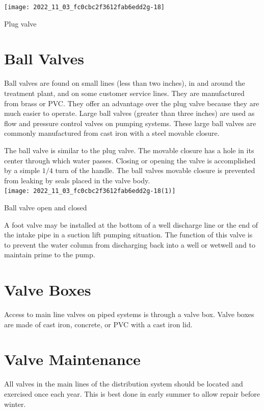 \documentclass[10pt]{article}
\begin{document}
\texttt{[image: 2022\_11\_03\_fc0cbc2f3612fab6edd2g-18]}

Plug valve

\section{Ball Valves}
Ball valves are found on small lines (less than two inches), in and around the treatment plant, and on some customer service lines. They are manufactured from brass or PVC. They offer an advantage over the plug valve because they are much easier to operate. Large ball valves (greater than three inches) are used as flow and pressure control valves on pumping systems. These large ball valves are commonly manufactured from cast iron with a steel movable closure.

The ball valve is similar to the plug valve. The movable closure has a hole in its center through which water passes. Closing or opening the valve is accomplished by a simple $1 / 4$ turn of the handle. The ball valves movable closure is prevented from leaking by seals placed in the valve body.\\

\texttt{[image: 2022\_11\_03\_fc0cbc2f3612fab6edd2g-18(1)]}

Ball valve open and closed

A foot valve may be installed at the bottom of a well discharge line or the end of the intake pipe in a suction lift pumping situation. The function of this valve is to prevent the water column from discharging back into a well or wetwell and to maintain prime to the pump.

\section{Valve Boxes}
Access to main line valves on piped systems is through a valve box. Valve boxes are made of cast iron, concrete, or PVC with a cast iron lid.

\section{Valve Maintenance}
All valves in the main lines of the distribution system should be located and exercised once each year. This is best done in early summer to allow repair before winter.
\end{document}
